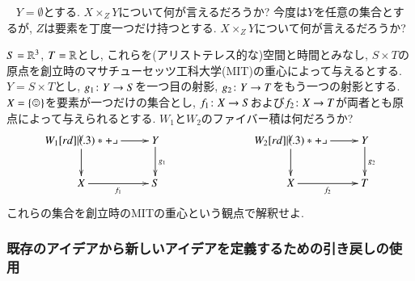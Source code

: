 \begin{exercise}~
\sexc $Y=\emptyset$とする. $X\times_ZY$について何が言えるだろうか?
\next 今度は$Y$を任意の集合とするが, $Z$は要素を丁度一つだけ持つとする. $X\times_ZY$について何が言えるだろうか?
\endsexc
\end{exercise}

\begin{exercise}
$S={\mathbb R}^3$, $T={\mathbb R}$とし, これらを(アリストテレス的な)空間と時間とみなし, $S\times T$の原点を創立時のマサチューセッツ工科大学(MIT)の重心によって与えるとする. $Y=S\times T$とし, $g_1\colon Y\rightarrow S$を一つ目の射影, $g_2\colon Y\rightarrow T$をもう一つの射影とする. $X=\singleton$を要素が一つだけの集合とし, $f_1\colon X\rightarrow S$および$f_2\colon X\rightarrow T$が両者とも原点によって与えられるとする. 
\sexc $W_1$と$W_2$のファイバー積は何だろうか?
$$
\xymatrix{W_1\ar[r]\ar[d]\ullimit&Y\ar[d]^{g_1}\\X\ar[r]_{f_1}&S}\hspace{1in}
\xymatrix{W_2\ar[r]\ar[d]\ullimit&Y\ar[d]^{g_2}\\X\ar[r]_{f_2}&T}
$$
\next これらの集合を創立時のMITの重心という観点で解釈せよ.
\endsexc
\end{exercise}


\subsubsection{既存のアイデアから新しいアイデアを定義するための引き戻しの使用}

